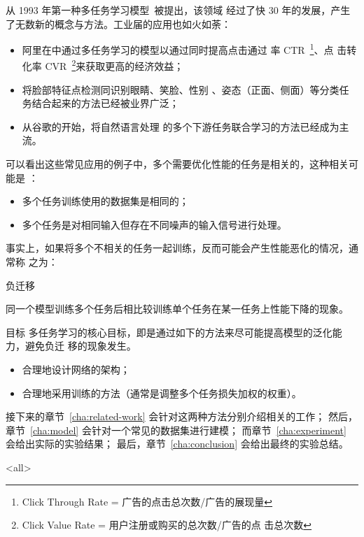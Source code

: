 \documentclass[../main]{subfiles}
\begin{document}
从 1993 年第一种多任务学习模型~\cite{DBLP:conf/icml/Caruana93}被提出，该领域
经过了快 30 年的发展，产生了无数新的概念与方法。工业届的应用也如火如荼：

\begin{itemize}
  \item 阿里在\cite{ma2018entire}中通过多任务学习的模型以通过同时提高点击通过
    率 CTR~\footnote{Click Through Rate = 广告的点击总次数/广告的展现量}、点
    击转化率 CVR~\footnote{Click Value Rate = 用户注册或购买的总次数/广告的点
    击总次数}来获取更高的经济效益；
  \item\cite{DBLP:conf/eccv/ZhangLLT14}将脸部特征点检测同识别眼睛、笑脸、性别
    、姿态（正面、侧面）等分类任务结合起来的方法已经被业界广泛；
  \item 从谷歌的\cite{DBLP:journals/corr/abs-1810-04805}开始，将自然语言处理
    的多个下游任务联合学习的方法已经成为主流。
\end{itemize}

可以看出这些常见应用的例子中，多个需要优化性能的任务是相关的，这种相关可能是
：

\begin{itemize}
  \item 多个任务训练使用的数据集是相同的；
  \item 多个任务是对相同输入但存在不同噪声的输入信号进行处理。
\end{itemize}

事实上，如果将多个不相关的任务一起训练，反而可能会产生性能恶化的情况，通常称
之为：

\begin{frame}{负迁移}
  \begin{definition}[负迁移]
    同一个模型训练多个任务后相比较训练单个任务在某一任务上性能下降的现象。
  \end{definition}
\end{frame}

\begin{frame}{目标}
  多任务学习的核心目标，即是通过如下的方法来尽可能提高模型的泛化能力，避免负迁
  移的现象发生。

  \begin{itemize}
    \item 合理地设计网络的架构；
    \item 合理地采用训练的方法（通常是调整多个任务损失加权的权重）。
  \end{itemize}
\end{frame}

接下来的章节~\ref{cha:related-work} 会针对这两种方法分别介绍相关的工作；
然后，章节~\ref{cha:model} 会针对一个常见的数据集进行建模；
而章节~\ref{cha:experiment} 会给出实际的实验结果；
最后，章节~\ref{cha:conclusion} 会给出最终的实验总结。

\mode<all>
\end{document}

